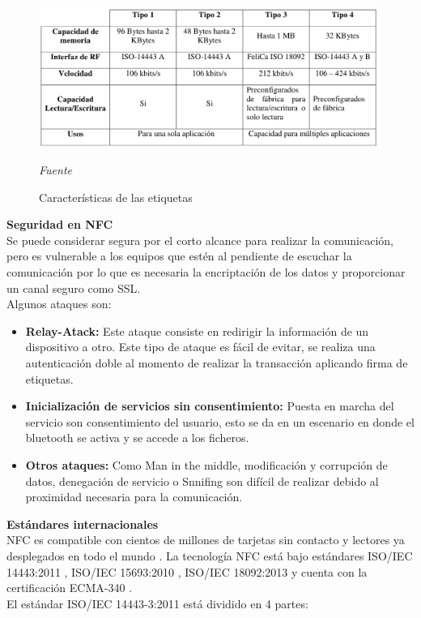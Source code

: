 \documentclass[11pt,openany]{book}
\newcounter{ns}
\begin{document}
	\begin{figure}[htb]
			\centering
			\includegraphics[width=1\textwidth]{imagenes/tags.PNG}
			\caption{Características de las etiquetas}
			\textsl{Fuente }\cite{VicenteGarcia2011,Cherrez2010}
			\label{etiquetas}
	\end{figure}
	\textbf{Seguridad en NFC}\\[0.25cm]
	Se puede considerar segura por el corto alcance para realizar la comunicación, pero es vulnerable a los equipos que estén al pendiente de escuchar la comunicación por lo que es necesaria la encriptación de los datos y proporcionar un canal seguro como SSL.\\
	Algunos ataques  son:
	\begin{itemize}
		\item \textbf{Relay-Atack: }Este ataque consiste en redirigir la información de un dispositivo a otro. Este tipo de ataque es fácil de evitar, se realiza una autenticación doble al momento de realizar la transacción aplicando firma de etiquetas.
		\item \textbf{Inicialización de servicios sin consentimiento: }Puesta en marcha del servicio son consentimiento del usuario, esto se da en un escenario en donde el bluetooth se activa y se accede a los ficheros.
		\item \textbf{Otros ataques: }Como Man in the middle, modificación y corrupción de datos, denegación de servicio o Snnifing son difícil de realizar debido al proximidad necesaria para la comunicación.
	\end{itemize}

	\textbf{Estándares internacionales}\\[0.25cm]

	NFC es compatible con cientos de millones de tarjetas sin contacto y lectores ya desplegados en todo el mundo \cite{NFC1}. La tecnología NFC está bajo estándares ISO/IEC 14443:2011 \cite{NFC2,Al-Akkad},  ISO/IEC 15693:2010 \cite{NFC3}, ISO/IEC 18092:2013 \cite{NFC2013} y cuenta con la certificación ECMA-340 \cite{ECMA,Benyo2009}.\\
	El estándar ISO/IEC 14443-3:2011 está dividido en 4 partes:
\end{document}
